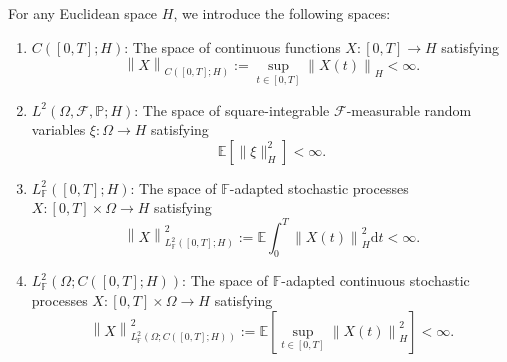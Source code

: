 \documentclass[lettersize,journal]{IEEEtran}
\theoremstyle{plain}
\theoremstyle{definition}
\begin{document}
For any Euclidean space $H$, we introduce the following spaces:
\begin{enumerate}
	\item $C([0,T];H)$: The space of continuous functions $X: [0,T] \rightarrow H$ satisfying
	\begin{equation*}
		\left\|X\right\|_{C([0,T];H)} := \sup_{t \in [0,T]}\left\|X(t)\right\|_{H} < \infty.
	\end{equation*}
	
	\item $L^2(\Omega,\mathcal{F},\mathbb{P};H)$: The space of square-integrable $\mathcal{F}$-measurable random variables $\xi: \Omega \rightarrow H$ satisfying
	\begin{equation*}
		\mathbb{E}[\|\xi\|_H^2] < \infty.
	\end{equation*}
	
	\item $L_{\mathbb{F}}^2([0,T];H)$: The space of $\mathbb{F}$-adapted stochastic processes $X: [0,T]\times \Omega \rightarrow H$ satisfying
	\begin{equation*}
		\left\|X\right\|_{L_{\mathbb{F}}^2([0,T];H)}^2 := \mathbb{E}\int_{0}^{T} \left\|X(t)\right\|_H^2 \mathrm{d}t < \infty.
	\end{equation*}
	
	\item $L_{\mathbb{F}}^2(\Omega;C([0,T];H))$: The space of $\mathbb{F}$-adapted continuous stochastic processes $X: [0,T] \times \Omega \rightarrow H$ satisfying
	\begin{equation*}
		\left\|X\right\|_{L_{\mathbb{F}}^2(\Omega;C([0,T];H))}^2 := \mathbb{E}\left[\sup_{t \in [0,T]} \left\|X(t)\right\|_H^2\right] < \infty.
	\end{equation*}
\end{enumerate}
\end{document}
